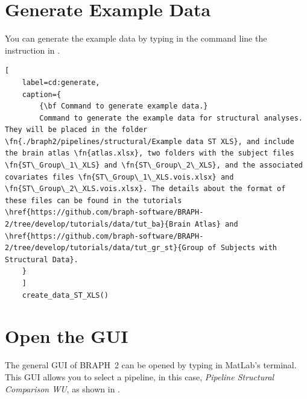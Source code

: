 \documentclass[justified]{tufte-handout}
\begin{document}
\begin{abstract}
\noindent
This tutorial shows how to perform a network analysis using \emph{structural data} (see tutorial \href{https://github.com/braph-software/BRAPH-2/tree/develop/tutorials/data/tut_gr_st}{Group of Subjects with Structural Data}), where one connectivity matrix per group is calculated, as in T1-weighted imaging, static arterial spin labelling, and positron emission tomography. Step by step, this pipeline guides you to compare the data from two groups of subjects using their unthresholded weighted matrices, which correspond, for example, to correlation coefficients in cortical thickness, blood perfusion, or glucose metabolism. You will also be able to generate publication-quality figures.
\end{abstract}


\tableofcontents


\clearpage

\section{Generate Example Data}

You can generate the example data by typing in the command line the instruction in .

\begin{lstlisting}[
	label=cd:generate,
	caption={
		{\bf Command to generate example data.}
		Command to generate the example data for structural analyses. They will be placed in the folder \fn{./braph2/pipelines/structural/Example data ST XLS}, and include the brain atlas \fn{atlas.xlsx}, two folders with the subject files \fn{ST\_Group\_1\_XLS} and \fn{ST\_Group\_2\_XLS}, and the associated covariates files \fn{ST\_Group\_1\_XLS.vois.xlsx} and \fn{ST\_Group\_2\_XLS.vois.xlsx}. The details about the format of these files can be found in the tutorials \href{https://github.com/braph-software/BRAPH-2/tree/develop/tutorials/data/tut_ba}{Brain Atlas} and \href{https://github.com/braph-software/BRAPH-2/tree/develop/tutorials/data/tut_gr_st}{Group of Subjects with Structural Data}.
	}
	]
	create_data_ST_XLS()
\end{lstlisting}


\section{Open the GUI}

The general GUI of BRAPH~2 can be opened by typing  in MatLab's terminal. This GUI allows you to select a pipeline, in this case, \emph{Pipeline Structural Comparison WU}, as shown in .
\end{document}
